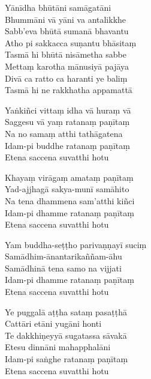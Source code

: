 

\bigskip

\begin{paritta}

Yānīdha bhūtāni samāgatāni\\
Bhummāni vā yāni va antalikkhe\\
Sabb'eva bhūtā sumanā bhavantu\\
Atho pi sakkacca suṇantu bhāsitaṃ\\
Tasmā hi bhūtā nisāmetha sabbe\\
Mettaṃ karotha mānusiyā pajāya\\
Divā ca ratto ca haranti ye baliṃ\\
Tasmā hi ne rakkhatha appamattā


\label{yankinci-vittam}
%
Yaṅkiñci vittaṃ idha vā huraṃ vā\\
Saggesu vā yaṃ ratanaṃ paṇītaṃ\\
Na no samaṃ atthi tathāgatena\\
Idam-pi buddhe ratanaṃ paṇītaṃ\\
Etena saccena suvatthi hotu

%
Khayaṃ virāgaṃ amataṃ paṇītaṃ\\
Yad-ajjhagā sakya-munī samāhito\\
Na tena dhammena sam'atthi kiñci\\
Idam-pi dhamme ratanaṃ paṇītaṃ\\
Etena saccena suvatthi hotu

%
Yam buddha-seṭṭho parivaṇṇayī suciṃ\\
Samādhim-ānantarikaññam-āhu\\
Samādhinā tena samo na vijjati\\
Idam-pi dhamme ratanaṃ paṇītaṃ\\
Etena saccena suvatthi hotu

%
Ye puggalā aṭṭha sataṃ pasaṭṭhā\\
Cattāri etāni yugāni honti\\
Te dakkhiṇeyyā sugatassa sāvakā\\
Etesu dinnāni mahapphalāni\\
Idam-pi saṅghe ratanaṃ paṇītaṃ\\
Etena saccena suvatthi hotu


\end{paritta}
